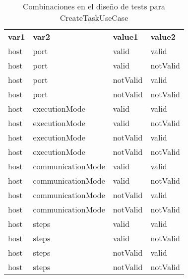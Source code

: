 \begin{table}[H]
    \caption{Combinaciones en el diseño de tests para CreateTaskUseCase}\label{tab:combCreateTaskUseCase}
    \small
    \begin{tabular}{llll}
        \textbf{var1}     & \textbf{var2}     & \textbf{value1} & \textbf{value2} \\
        host              & port              & valid           & valid           \\
        \hline
        host              & port              & valid           & notValid        \\
        \hline
        host              & port              & notValid        & valid           \\
        \hline
        host              & port              & notValid        & notValid        \\
        \hline
        host              & executionMode     & valid           & valid           \\
        \hline
        host              & executionMode     & valid           & notValid        \\
        \hline
        host              & executionMode     & notValid        & valid           \\
        \hline
        host              & executionMode     & notValid        & notValid        \\
        \hline
        host              & communicationMode & valid           & valid           \\
        \hline
        host              & communicationMode & valid           & notValid        \\
        \hline
        host              & communicationMode & notValid        & valid           \\
        \hline
        host              & communicationMode & notValid        & notValid        \\
        \hline
        host              & steps             & valid           & valid           \\
        \hline
        host              & steps             & valid           & notValid        \\
        \hline
        host              & steps             & notValid        & valid           \\
        \hline
        host              & steps             & notValid        & notValid        \\
        \hline

\end{tabular}
\end{table}
